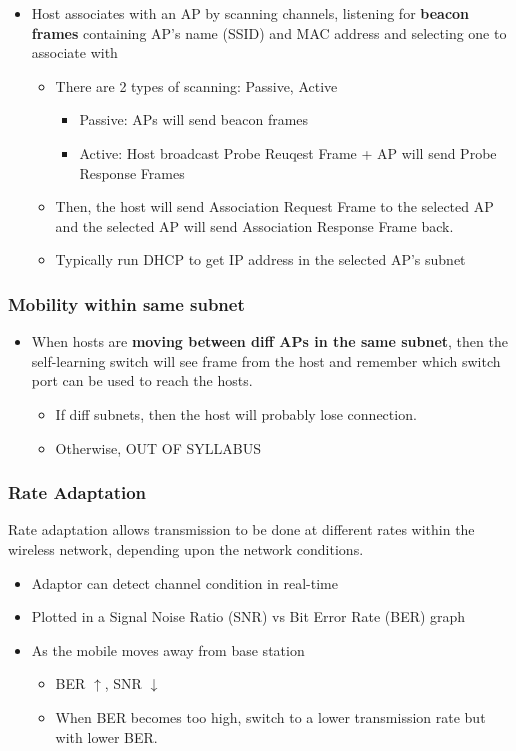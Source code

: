 \documentclass[a4paper]{article}
\begin{document}
\begin{itemize}
    \item Host associates with an AP by scanning channels, listening for \textbf{beacon frames} containing AP's name (SSID) and MAC address and selecting one to associate with
    \begin{itemize}[label=$\circ$]
        \item There are 2 types of scanning: Passive, Active
        \begin{itemize}[label=\tiny$\blacksquare$]
            \item Passive: APs will send beacon frames
            \item Active: Host broadcast Probe Reuqest Frame + AP will send Probe Response Frames
        \end{itemize}
        \item Then, the host will send Association Request Frame to the selected AP and the selected AP will send Association Response Frame back.
        \item Typically run DHCP to get IP address in the selected AP's subnet
    \end{itemize}
\end{itemize}

\subsubsection{Mobility within same subnet}
\begin{itemize}
    \item When hosts are \textbf{moving between diff APs in the same subnet}, then the self-learning switch will see frame from the host and remember which switch port can be used to reach the hosts.
    \begin{itemize}[label=$\circ$]
        \item If diff subnets, then the host will probably lose connection.
        \item Otherwise, OUT OF SYLLABUS
    \end{itemize}
\end{itemize}

\subsubsection{Rate Adaptation}
Rate adaptation allows transmission to be done at different rates within the wireless network, depending upon the network conditions.
\begin{itemize}
    \item Adaptor can detect channel condition in real-time
    \item Plotted in a Signal Noise Ratio (SNR) vs Bit Error Rate (BER) graph
    \item As the mobile moves away from base station
    \begin{itemize}[label=$\circ$]
        \item BER $\uparrow$, SNR $\downarrow$
        \item When BER becomes too high, switch to a lower transmission rate but with lower BER.
    \end{itemize}
\end{itemize}
\end{document}
